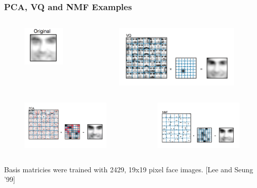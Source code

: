 \documentclass{beamer}
\begin{document}
\begin{frame}
\frametitle{PCA, VQ and NMF Examples}
\begin{columns}
\begin{column}{0.5\textwidth}
\begin{figure}[h]
  \vspace*{-1cm}
  \includegraphics[width=2cm,center]{face}
  \centering
\end{figure}
\end{column}

\begin{column}{0.5\textwidth}
\begin{figure}[h]
  \vspace*{-1cm}
  \includegraphics[width=6cm,center]{lee2}
  \centering
\end{figure}
\end{column}
\end{columns}

\begin{columns}
\begin{column}{0.5\textwidth}
\begin{figure}[h]
  \vspace*{-0.5cm}
  \includegraphics[width=6cm,center]{lee3}
  \centering
\end{figure}
\end{column}

\begin{column}{0.5\textwidth}
\begin{figure}[h]
  \vspace*{-0.5cm}
  \includegraphics[width=6cm,center]{lee1}
  \centering
\end{figure}
\end{column}
\end{columns}
Basis matricies were trained with 2429, 19x19 pixel face images. [Lee and Seung '99]
\end{frame}
\end{document}
